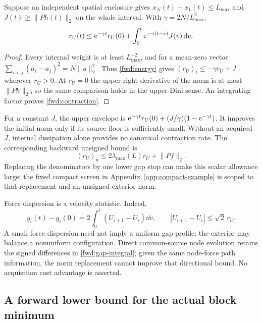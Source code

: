 \begin{corollary}
\label{fwd:force-contraction}
Suppose an independent spatial enclosure gives
$x_N(t)-x_1(t)\le L_{\max}$ and $J(t)\ge\lVert Ph(t)\rVert_2$ on the
whole interval. With $\gamma=2N/L_{\max}^2$,
\begin{equation}
 r_U(t)\le \mathrm e^{-\gamma t}r_U(0)
       +\int_0^t\mathrm e^{-\gamma(t-v)}J(v)\,\mathrm d v.
 \label{fwd:contraction}
\end{equation}
\end{corollary}
\begin{proof}
Every internal weight is at least $L_{\max}^{-2}$, and for a mean-zero
vector $\sum_{i<j}(a_i-a_j)^2=N\lVert a\rVert_2^2$. Thus
\eqref{fwd:energy} gives
$(r_U)_t\le-\gamma r_U+J$ wherever $r_U>0$.
At $r_U=0$ the upper right derivative of the norm is at most $\lVert Ph\rVert_2$,
so the same comparison holds in the upper-Dini sense. An integrating
factor proves \eqref{fwd:contraction}.
\end{proof}

For a constant $J$, the upper envelope is
$\mathrm e^{-\gamma t}r_U(0)+(J/\gamma)(1-\mathrm e^{-\gamma t})$.
It improves the initial norm only if its source floor is sufficiently
small. Without an acquired $J$, internal dissipation alone provides no
canonical contraction rate. The corresponding backward unsigned bound is
\begin{equation}
 (r_U)_u\le2\lambda_{\max}(L)r_U+\lVert Pf\rVert_2.
 \label{fwd:backward-norm}
\end{equation}
Replacing the denominators by one lower gap stop can make this scalar
allowance large; the fixed compact screen in
Appendix~\ref{app:compact-example} is scoped to that replacement and an
unsigned exterior norm.

Force dispersion is a velocity statistic. Indeed,
\begin{equation}
 g_i(t)-g_i(0)=2\int_0^t(U_{i+1}-U_i)\dd v,
 \qquad |U_{i+1}-U_i|\le\sqrt2\,r_U.
 \label{fwd:gap-integral}
\end{equation}
A small force dispersion need not imply a uniform gap profile: the
exterior may balance a nonuniform configuration. Direct common-source
node evolution retains the signed differences in
\eqref{fwd:gap-integral}; given the same node-force path information, the
norm replacement cannot improve that directional bound. No acquisition
cost advantage is asserted.

\subsection{A forward lower bound for the actual block minimum}

